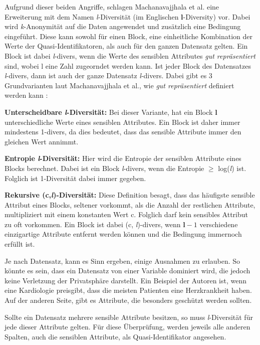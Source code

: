 Aufgrund dieser beiden Angriffe, schlagen Machanavajjhala et al. \cite{P-24} eine Erweiterung mit dem Namen \textit{l}-Diversität (im Englischen \textbf{l}-Diversity) vor.
Dabei wird \textit{k}-Anonymität auf die Daten angewendet und zusätzlich eine Bedingung eingeführt. 
Diese kann sowohl für einen Block, eine einheitliche Kombination der Werte der Quasi-Identifikatoren, als auch für den ganzen Datensatz gelten.
Ein Block ist dabei \textit{l}-divers, wenn die Werte des sensiblen Attributes \textit{\dq gut repräsentiert\dq} sind, wobei l eine Zahl zugeorndet werden kann.
Ist jeder Block des Datensatzes \textit{l}-divers, dann ist auch der ganze Datensatz \textit{l}-divers.
Dabei gibt es 3 Grundvarianten laut Machanavajjhala et al., wie \textit{\dq gut repräsentiert\dq} definiert werden kann \cite{P-24}:
\begin{compactitem}
\item \textbf{Unterscheidbare \textit{l}-Diversität:} Bei dieser Variante, hat ein Block \textbf{l} unterschiedliche Werte eines sensiblen Attributes. Ein Block ist daher immer mindestens 1-divers, da dies bedeutet, dass das sensible Attribute immer den gleichen Wert annimmt.
\item \textbf{Entropie \textit{l}-Diversität:} Hier wird die Entropie der sensiblen Attribute eines Blocks berechnet. Dabei ist ein Block \textit{l}-divers, wenn die Entropie $\ge$ log(\textit{l}) ist. Folglich ist 1-Diversität dabei immer gegeben.
\item \textbf{Rekursive (c,\textit{l})-Diversität:} Diese Definition besagt, dass das häufigste sensible Attribut eines Blocks, seltener vorkommt, als die Anzahl der restlichen Attribute, multipliziert mit einem konstanten Wert c. Folglich darf kein sensibles Attribut zu oft vorkommen. Ein Block ist dabei (c, \textit{l})-divers, wenn $\textbf{l} - 1$ verschiedene einzigartige Attribute entfernt werden können und die Bedingung immernoch erfüllt ist.
\end{compactitem}

Je nach Datensatz, kann es Sinn ergeben, einige Ausnahmen zu erlauben.
So könnte es sein, dass ein Datensatz von einer Variable dominiert wird, die jedoch keine Verletzung der Privatsphäre darstellt. 
Ein Beispiel der Autoren ist, wenn eine Kardiologie preisgibt, dass die meisten Patienten eine Herzkrankheit haben.
Auf der anderen Seite, gibt es Attribute, die besonders geschützt werden sollten.

Sollte ein Datensatz mehrere sensible Attribute besitzen, so muss \textit{l}-Diversität für jede dieser Attribute gelten. 
Für diese Überprüfung, werden jeweils alle anderen Spalten, auch die sensiblen Attribute, als Quasi-Identifikator angesehen.

